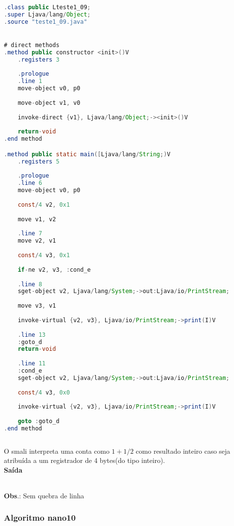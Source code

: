 \documentclass[hidelinks,12pt]{article}
\begin{document}
	\begin{lstlisting}[caption=Smali resultante do .java,language=java]
.class public Lteste1_09;
.super Ljava/lang/Object;
.source "teste1_09.java"


# direct methods
.method public constructor <init>()V
	.registers 3
	
	.prologue
	.line 1
	move-object v0, p0
	
	move-object v1, v0
	
	invoke-direct {v1}, Ljava/lang/Object;-><init>()V
	
	return-void
.end method

.method public static main([Ljava/lang/String;)V
	.registers 5
	
	.prologue
	.line 6
	move-object v0, p0
	
	const/4 v2, 0x1
	
	move v1, v2
	
	.line 7
	move v2, v1
	
	const/4 v3, 0x1
	
	if-ne v2, v3, :cond_e
	
	.line 8
	sget-object v2, Ljava/lang/System;->out:Ljava/io/PrintStream;
	
	move v3, v1
	
	invoke-virtual {v2, v3}, Ljava/io/PrintStream;->print(I)V
	
	.line 13
	:goto_d
	return-void
	
	.line 11
	:cond_e
	sget-object v2, Ljava/lang/System;->out:Ljava/io/PrintStream;
	
	const/4 v3, 0x0
	
	invoke-virtual {v2, v3}, Ljava/io/PrintStream;->print(I)V
	
	goto :goto_d
.end method	
	
	\end{lstlisting}
	
	O smali interpreta uma conta como $1+1/2$ como resultado inteiro caso seja atribuída a um registrador de 4 bytes(do tipo inteiro).\\
	
	{\large{\textbf{Saída}}}
	
	\noindent{}\\	
	
	\textbf{Obs}.: Sem quebra de linha\\
	
	\subsubsection{Algoritmo nano10}
	
\end{document}
